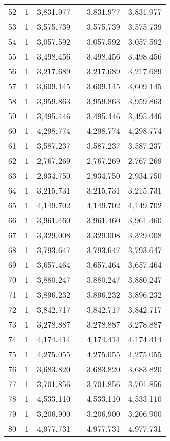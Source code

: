 \begin{table}[!htbp]
\begin{tabular}{@{\extracolsep{5pt}}lccccc}
52 & 1 & 3,831.977 &  & 3,831.977 & 3,831.977 \\ 
53 & 1 & 3,575.739 &  & 3,575.739 & 3,575.739 \\ 
54 & 1 & 3,057.592 &  & 3,057.592 & 3,057.592 \\ 
55 & 1 & 3,498.456 &  & 3,498.456 & 3,498.456 \\ 
56 & 1 & 3,217.689 &  & 3,217.689 & 3,217.689 \\ 
57 & 1 & 3,609.145 &  & 3,609.145 & 3,609.145 \\ 
58 & 1 & 3,959.863 &  & 3,959.863 & 3,959.863 \\ 
59 & 1 & 3,495.446 &  & 3,495.446 & 3,495.446 \\ 
60 & 1 & 4,298.774 &  & 4,298.774 & 4,298.774 \\ 
61 & 1 & 3,587.237 &  & 3,587.237 & 3,587.237 \\ 
62 & 1 & 2,767.269 &  & 2,767.269 & 2,767.269 \\ 
63 & 1 & 2,934.750 &  & 2,934.750 & 2,934.750 \\ 
64 & 1 & 3,215.731 &  & 3,215.731 & 3,215.731 \\ 
65 & 1 & 4,149.702 &  & 4,149.702 & 4,149.702 \\ 
66 & 1 & 3,961.460 &  & 3,961.460 & 3,961.460 \\ 
67 & 1 & 3,329.008 &  & 3,329.008 & 3,329.008 \\ 
68 & 1 & 3,793.647 &  & 3,793.647 & 3,793.647 \\ 
69 & 1 & 3,657.464 &  & 3,657.464 & 3,657.464 \\ 
70 & 1 & 3,880.247 &  & 3,880.247 & 3,880.247 \\ 
71 & 1 & 3,896.232 &  & 3,896.232 & 3,896.232 \\ 
72 & 1 & 3,842.717 &  & 3,842.717 & 3,842.717 \\ 
73 & 1 & 3,278.887 &  & 3,278.887 & 3,278.887 \\ 
74 & 1 & 4,174.414 &  & 4,174.414 & 4,174.414 \\ 
75 & 1 & 4,275.055 &  & 4,275.055 & 4,275.055 \\ 
76 & 1 & 3,683.820 &  & 3,683.820 & 3,683.820 \\ 
77 & 1 & 3,701.856 &  & 3,701.856 & 3,701.856 \\ 
78 & 1 & 4,533.110 &  & 4,533.110 & 4,533.110 \\ 
79 & 1 & 3,206.900 &  & 3,206.900 & 3,206.900 \\ 
80 & 1 & 4,977.731 &  & 4,977.731 & 4,977.731 \\ 

\end{tabular}
\end{table}
